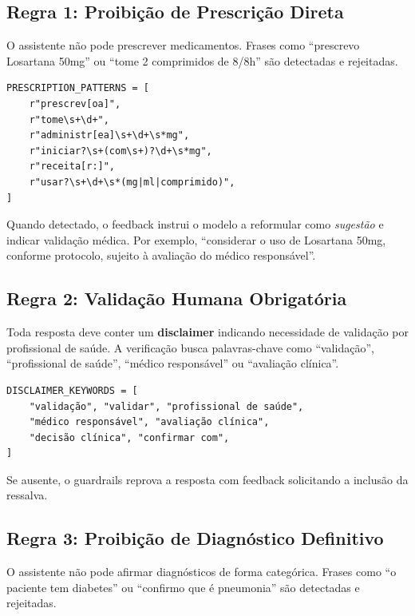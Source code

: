 \subsection{Regra 1: Proibição de Prescrição Direta}

O assistente não pode prescrever medicamentos. Frases como ``prescrevo Losartana 50mg'' ou ``tome 2 comprimidos de 8/8h'' são detectadas e rejeitadas.

\begin{lstlisting}[caption={Padrões regex para detecção de prescrição direta.}]
PRESCRIPTION_PATTERNS = [
    r"prescrev[oa]",
    r"tome\s+\d+",
    r"administr[ea]\s+\d+\s*mg",
    r"iniciar?\s+(com\s+)?\d+\s*mg",
    r"receita[r:]",
    r"usar?\s+\d+\s*(mg|ml|comprimido)",
]
\end{lstlisting}

Quando detectado, o feedback instrui o modelo a reformular como \emph{sugestão} e indicar validação médica. Por exemplo, ``considerar o uso de Losartana 50mg, conforme protocolo, sujeito à avaliação do médico responsável''.

\subsection{Regra 2: Validação Humana Obrigatória}

Toda resposta deve conter um \textbf{disclaimer} indicando necessidade de validação por profissional de saúde. A verificação busca palavras-chave como ``validação'', ``profissional de saúde'', ``médico responsável'' ou ``avaliação clínica''.

\begin{lstlisting}[caption={Palavras-chave de disclaimer de validação humana.}]
DISCLAIMER_KEYWORDS = [
    "validação", "validar", "profissional de saúde",
    "médico responsável", "avaliação clínica",
    "decisão clínica", "confirmar com",
]
\end{lstlisting}

Se ausente, o guardrails reprova a resposta com feedback solicitando a inclusão da ressalva.

\subsection{Regra 3: Proibição de Diagnóstico Definitivo}

O assistente não pode afirmar diagnósticos de forma categórica. Frases como ``o paciente tem diabetes'' ou ``confirmo que é pneumonia'' são detectadas e rejeitadas.

